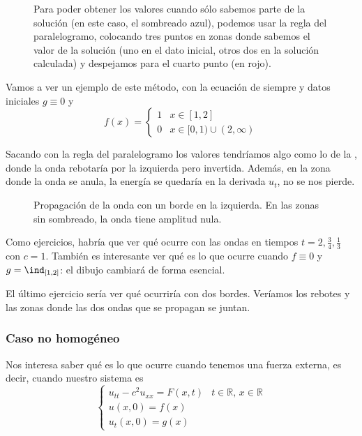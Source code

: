 		\begin{figure}[hbtp]
		\caption{Para poder obtener los valores cuando sólo sabemos parte de la solución (en este caso, el sombreado azul), podemos usar la regla del paralelogramo, colocando tres puntos en zonas donde sabemos el valor de la solución (uno en el dato inicial, otros dos en la solución calculada) y despejamos para el cuarto punto (en rojo).}
		\label{fig:AplicacionParalelogramo}
		\end{figure}

		Vamos a ver un ejemplo de este método, con la ecuación de siempre y datos iniciales $g \equiv 0$ y \[ f(x) = \begin{cases} 1 & x ∈ [1,2] \\ 0 & x ∈ [0,1) ∪ (2,∞) \end{cases} \]

		Sacando con la regla del paralelogramo los valores tendríamos algo como lo de la , donde la onda rebotaría por la izquierda pero invertida. Además, en la zona donde la onda se anula, la energía se quedaría en la derivada $u_t$, no se nos pierde.

		\begin{figure}[hbtp]
		\centering
		\caption{Propagación de la onda con un borde en la izquierda. En las zonas sin sombreado, la onda tiene amplitud nula.}
		\label{fig:OndaReflexion}
		\end{figure}


		Como ejercicios, habría que ver qué ocurre con las ondas en tiempos $t = 2, \frac{3}{4}, \frac{1}{3}$ con $c = 1$. También es interesante ver qué es lo que ocurre cuando $f \equiv 0$ y $g = \ind_{[1,2]}$: el dibujo cambiará de forma esencial.

		El último ejercicio sería ver qué ocurriría con dos bordes. Veríamos los rebotes y las zonas donde las dos ondas que se propagan se juntan.

		\subsubsection{Caso no homogéneo}
		\label{sec:Onda:NoHomogeneo}

		Nos interesa saber qué es lo que ocurre cuando tenemos una fuerza externa, es decir, cuando nuestro sistema es \[ \begin{cases}
		u_{tt} - c^2 u_{xx} = F(x,t) & t ∈ ℝ, \, x ∈ ℝ \\
		u(x,0) = f(x) \\
		u_t(x,0) = g(x) \end{cases}\]

